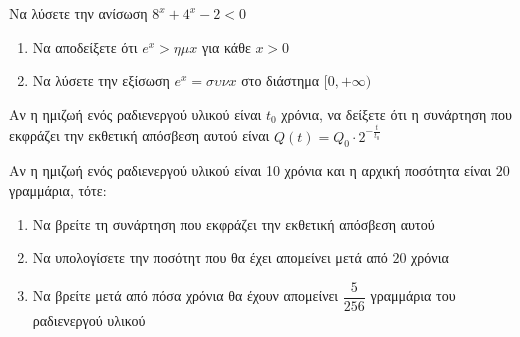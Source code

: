 \documentclass{presentation}
\begin{document}
\begin{askisi}
  Να λύσετε την ανίσωση $8^x+4^x-2<0$


\end{askisi}

\begin{askisi}
  \begin{enumerate}
    \item<1-> Να αποδείξετε ότι $e^x>ημx$ για κάθε $x>0$
    \item<2-> Να λύσετε την εξίσωση $e^x=συνx$ στο διάστημα $[0,+\infty)$
  \end{enumerate}


\end{askisi}

\begin{askisi}
  Αν η ημιζωή ενός ραδιενεργού υλικού είναι $t_0$ χρόνια, να δείξετε ότι η συνάρτηση που εκφράζει την εκθετική απόσβεση αυτού είναι $Q(t)=Q_0\cdot 2^{-\frac{t}{t_0}}$


\end{askisi}

\begin{askisi}
  Αν η ημιζωή ενός ραδιενεργού υλικού είναι 10 χρόνια και η αρχική ποσότητα είναι $20$ γραμμάρια, τότε:
  \begin{enumerate}
    \item<1-> Να βρείτε τη συνάρτηση που εκφράζει την εκθετική απόσβεση αυτού
    \item<2-> Να υπολογίσετε την ποσότητ που θα έχει απομείνει μετά από $20$ χρόνια
    \item<3-> Να βρείτε μετά από πόσα χρόνια θα έχουν απομείνει $\dfrac{5}{256}$ γραμμάρια του ραδιενεργού υλικού
  \end{enumerate}


\end{askisi}


%
%
%
%
%
%
%
\end{document}
